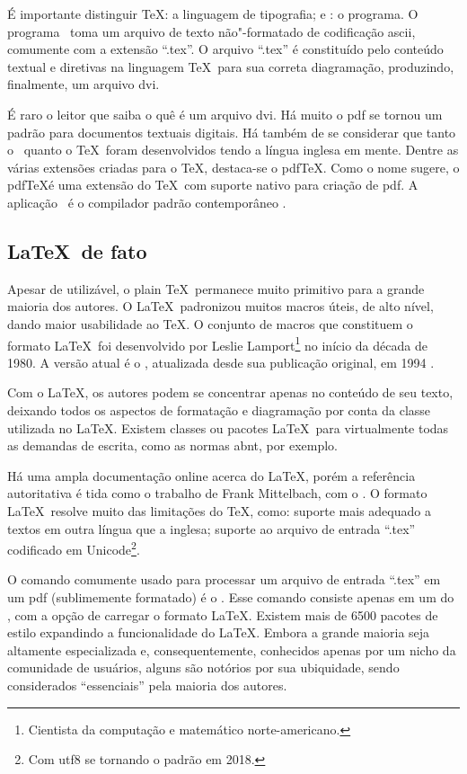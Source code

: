 É importante distinguir \TeX: a linguagem de tipografia; e \tex: o programa. O programa \tex\ toma um arquivo de texto não"-formatado de codificação \ac{ascii}, comumente com a extensão \enquote{.tex}. O arquivo \enquote{.tex} é constituído pelo conteúdo textual e diretivas na linguagem \TeX\ para sua correta diagramação, produzindo, finalmente, um arquivo \ac{dvi}.

É raro o leitor que saiba o quê é um arquivo \ac{dvi}. Há muito o \ac{pdf} se tornou um padrão  para documentos textuais digitais. Há também de se considerar que tanto o \tex\ quanto o \TeX\ foram desenvolvidos tendo a língua inglesa em mente. Dentre as várias extensões criadas para o \TeX, destaca-se o pdf\TeX. Como o nome sugere, o pdf\TeX é uma extensão do \TeX\ com suporte nativo para criação de \ac{pdf}. A aplicação \pdftex\ é o compilador padrão contemporâneo \cite{Thanh2024}.

\subsection{\LaTeX\ de fato}

Apesar de utilizável, o plain \TeX\ permanece muito primitivo para a grande maioria dos autores. O \LaTeX\ padronizou muitos macros úteis, de alto nível, dando maior usabilidade ao \TeX. O conjunto de macros que constituem o formato \LaTeX\ foi desenvolvido por Leslie Lamport\footnote{Cientista da computação e matemático norte-americano.} no início da década de 1980. A versão atual é o \LaTeXe, atualizada desde sua publicação original, em 1994 \cite{Lamport1994}.

Com o \LaTeX, os autores podem se concentrar apenas no conteúdo de seu texto, deixando todos os aspectos de formatação e diagramação por conta da classe utilizada no \LaTeX. Existem classes ou pacotes \LaTeX\ para virtualmente todas as demandas de escrita, como as normas \ac{abnt}, por exemplo.

Há uma ampla documentação online acerca do \LaTeX, porém a referência autoritativa é tida como o trabalho de Frank Mittelbach, com o  \cite{Mittelbach2023}. O formato \LaTeX\ resolve muito das limitações do \TeX, como: suporte mais adequado a textos em outra língua que a inglesa; suporte ao arquivo de entrada \enquote{.tex} codificado em Unicode\footnote{Com \ac{utf8} se tornando o padrão em 2018.}.

O comando comumente usado para processar um arquivo de entrada \enquote{.tex} em um \ac{pdf} (sublimemente formatado) é o \pdflatex. Esse comando consiste apenas em um  do \pdftex, com a opção de carregar o formato \LaTeX. Existem mais de 6500 pacotes de estilo expandindo a funcionalidade do \LaTeX. Embora a grande maioria seja altamente especializada e, consequentemente, conhecidos apenas por um nicho da comunidade de usuários, alguns são notórios por sua ubiquidade, sendo considerados \enquote{essenciais} pela maioria dos autores.

